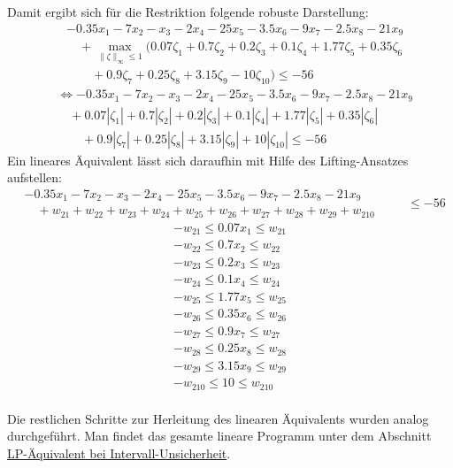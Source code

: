 \documentclass[a4paper,12pt]{article}
\begin{document}
Damit ergibt sich f\"ur die Restriktion folgende robuste Darstellung:
\[
\begin{aligned}
    &-0.35x_1 - 7x_2 - x_3 - 2x_4 - 25x_5 - 3.5x_6 - 9x_7 - 2.5x_8 - 21x_9 \\
    &\quad + \max_{\|\zeta\|_\infty \leq 1} \big( 0.07\zeta_1 + 0.7\zeta_2 + 0.2\zeta_3 + 0.1\zeta_4 + 1.77\zeta_5 +  0.35\zeta_6\\
    &\qquad + 0.9\zeta_7 + 0.25\zeta_8 + 3.15\zeta_9 - 10\zeta_{10} \big) \leq -56
\end{aligned}
\]
\[
\begin{aligned}
    &\Leftrightarrow -0.35x_1 - 7x_2 - x_3 - 2x_4 - 25x_5 - 3.5x_6 - 9x_7 - 2.5x_8 - 21x_9 \\
    &\quad + 0.07|\zeta_1| + 0.7|\zeta_2| + 0.2|\zeta_3| + 0.1|\zeta_4| + 1.77|\zeta_5| + 0.35|\zeta_6| \\
    &\qquad + 0.9|\zeta_7| + 0.25|\zeta_8| + 3.15|\zeta_9| + 10|\zeta_{10}| \leq -56
\end{aligned}
\]
\newpage
Ein lineares \"Aquivalent l\"asst sich daraufhin mit Hilfe des Lifting-Ansatzes aufstellen:
\[
\begin{aligned}
    &-0.35x_1 - 7x_2 - x_3 - 2x_4 - 25x_5 - 3.5x_6 - 9x_7 - 2.5x_8 - 21x_9 \\
    &\quad + w_{21} + w_{22} + w_{23} + w_{24} + w_{25} + w_{26} + w_{27}+ w_{28}+ w_{29}+ w_{210}
\end{aligned}
\begin{aligned}
    &\quad \leq -56
\end{aligned}
\]
\[
\begin{aligned} 
    -w_{21} \leq 0.07x_1 \leq w_{21} \\
    -w_{22} \leq 0.7x_2 \leq w_{22} \\
    -w_{23} \leq 0.2x_3 \leq w_{23} \\
    -w_{24} \leq 0.1x_4 \leq w_{24} \\
    -w_{25} \leq 1.77x_5 \leq w_{25} \\
    -w_{26} \leq 0.35x_6 \leq w_{26} \\
    -w_{27} \leq 0.9x_7 \leq w_{27} \\
    -w_{28} \leq 0.25x_8 \leq w_{28} \\
    -w_{29} \leq 3.15x_9 \leq w_{29} \\
    -w_{210} \leq 10 \leq w_{210} \\
\end{aligned}
\]

Die restlichen Schritte zur Herleitung des linearen \"Aquivalents wurden analog durchgef\"uhrt. Man findet das gesamte lineare Programm unter dem Abschnitt \hyperref[sec:lp-equivalent]{LP-\"Aquivalent bei Intervall-Unsicherheit}.
\end{document}
